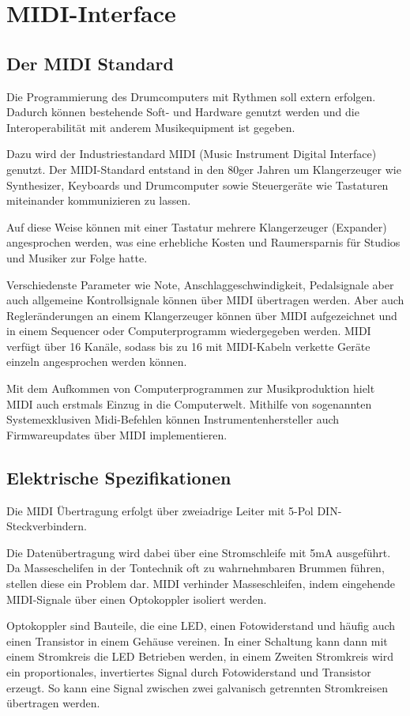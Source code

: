 \section{MIDI-Interface}
\subsection{Der MIDI Standard}
Die Programmierung des Drumcomputers mit Rythmen soll extern erfolgen. 
Dadurch können bestehende Soft- und Hardware genutzt werden und die Interoperabilität mit anderem Musikequipment ist gegeben.

Dazu wird der Industriestandard MIDI (Music Instrument Digital Interface) genutzt.
Der MIDI-Standard entstand in den 80ger Jahren um Klangerzeuger wie Synthesizer, Keyboards und Drumcomputer sowie Steuergeräte wie Tastaturen miteinander kommunizieren zu lassen.

Auf diese Weise können mit einer Tastatur mehrere Klangerzeuger (Expander) angesprochen werden, was eine erhebliche Kosten und Raumersparnis für Studios und Musiker zur Folge hatte.

Verschiedenste Parameter wie Note, Anschlaggeschwindigkeit, Pedalsignale aber auch allgemeine Kontrollsignale können über MIDI übertragen werden. Aber auch Regleränderungen an einem Klangerzeuger können über MIDI aufgezeichnet und in einem Sequencer oder Computerprogramm wiedergegeben werden.
MIDI verfügt über 16 Kanäle, sodass bis zu 16 mit MIDI-Kabeln verkette Geräte einzeln angesprochen werden können.

Mit dem Aufkommen von Computerprogrammen zur Musikproduktion hielt MIDI auch erstmals Einzug in die Computerwelt. Mithilfe von sogenannten Systemexklusiven Midi-Befehlen können Instrumentenhersteller auch Firmwareupdates über MIDI implementieren.


\subsection{Elektrische Spezifikationen}
Die MIDI Übertragung erfolgt über zweiadrige Leiter mit 5-Pol DIN-Steckverbindern.

Die Datenübertragung wird dabei über eine Stromschleife mit 5mA ausgeführt.
Da Masseschelifen in der Tontechnik oft zu wahrnehmbaren Brummen führen, stellen diese ein Problem dar.
MIDI verhinder Masseschleifen, indem eingehende MIDI-Signale über einen Optokoppler isoliert werden.

Optokoppler sind Bauteile, die eine LED, einen Fotowiderstand und häufig auch einen Transistor in einem Gehäuse vereinen.
In einer Schaltung kann dann mit einem Stromkreis die LED Betrieben werden, in einem Zweiten Stromkreis wird ein proportionales, invertiertes Signal durch Fotowiderstand und Transistor erzeugt. So kann eine Signal zwischen zwei galvanisch getrennten Stromkreisen übertragen werden.

